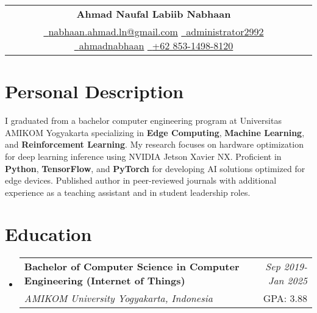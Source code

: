 \documentclass[a4paper,11pt]{article}
\makeatletter
\newcommand{\resumeSubheading}[4]{
\vspace{0.5mm}\item
    \begin{tabular*}{0.98\textwidth}[t]{l@{\extracolsep{\fill}}r}
        \textbf{#1} & \textit{\footnotesize{#4}} \\
        \textit{\footnotesize{#3}} &  \footnotesize{#2}\\
    \end{tabular*}
    \vspace{-2.4mm}
}
\newcommand{\resumeSubHeadingListStart}{\begin{itemize}[leftmargin=*,labelsep=0mm]}
\newcommand{\resumeSubHeadingListEnd}{\end{itemize}\vspace{2mm}}
\newcommand{\name}{Ahmad Naufal Labiib Nabhaan} %
\newcommand{\phone}{+62 853-1498-8120} %
\newcommand{\emaila}{nabhaan.ahmad.ln@gmail.com} %
\makeatother
\begin{document}
\selectfont

{
\begin{center}
\begin{tabularx}{\linewidth}{C r} %
  \\
  \textbf{\Huge \name} \\ %
  \href{mailto:\emaila}{\raisebox{0.0\height}{\footnotesize \faEnvelope}\ {\emaila}} \href{https://github.com/administrator2992}{\raisebox{0.0\height}{\footnotesize \faGithub}\ {administrator2992}} \href{https://linkedin.com/in/ahmadnabhaan/}{\raisebox{0.0\height}{\footnotesize \faLinkedin}\ {ahmadnabhaan}} \href{\phone}{\raisebox{0.0\height}{\footnotesize \faPhone}\ {\phone}}
\end{tabularx}
\end{center}

}

\section{\textbf{Personal Description}}
\vspace{2.5mm}
\begin{adjustwidth}{0mm}{0mm}
  \justifying  %
  \setlength{\parindent}{0pt}  %
  \setlength{\parskip}{2pt}    %
  
  I graduated from a bachelor computer engineering program at Universitas AMIKOM Yogyakarta specializing in \textbf{Edge Computing}, \textbf{Machine Learning}, and \textbf{Reinforcement Learning}. My research focuses on hardware optimization for deep learning inference using NVIDIA Jetson Xavier NX. Proficient in \textbf{Python}, \textbf{TensorFlow}, and \textbf{PyTorch} for developing AI solutions optimized for edge devices. Published author in peer-reviewed journals with additional experience as a teaching assistant and in student leadership roles.
  
  \end{adjustwidth}
\vspace{-2.5mm}

\section{\textbf{Education}}
  \resumeSubHeadingListStart
    \resumeSubheading
      {Bachelor of Computer Science in Computer Engineering (Internet of Things)}{GPA: 3.88}
      {AMIKOM University Yogyakarta, Indonesia}{Sep 2019- Jan 2025}
  \resumeSubHeadingListEnd
\vspace{-2.5mm}
%
\end{document}
